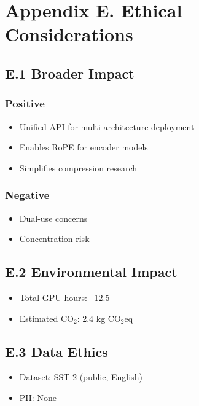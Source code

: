 
\section{Appendix E. Ethical Considerations}

\subsection{E.1 Broader Impact}

\subsubsection{Positive}
\begin{itemize}
\item Unified API for multi-architecture deployment
\item Enables RoPE for encoder models
\item Simplifies compression research

\end{itemize}
\subsubsection{Negative}
\begin{itemize}
\item Dual-use concerns
\item Concentration risk

\end{itemize}
\subsection{E.2 Environmental Impact}

\begin{itemize}
\item Total GPU-hours: ~12.5
\item Estimated CO$_2$: 2.4 kg CO$_2$eq

\end{itemize}
\subsection{E.3 Data Ethics}

\begin{itemize}
\item Dataset: SST-2 (public, English)
\item PII: None

\end{itemize}
